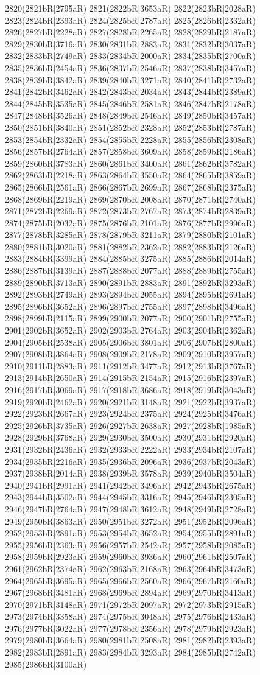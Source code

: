 2820(2821bR|2795aR) 2821(2822bR|3653aR) 2822(2823bR|2028aR) 2823(2824bR|2393aR) 2824(2825bR|2787aR) 2825(2826bR|2332aR) 2826(2827bR|2228aR) 2827(2828bR|2265aR) 2828(2829bR|2187aR) 2829(2830bR|3716aR) 2830(2831bR|2883aR) 2831(2832bR|3037aR) 2832(2833bR|2749aR) 2833(2834bR|2000aR) 2834(2835bR|2700aR) 2835(2836bR|2454aR) 2836(2837bR|2546aR) 2837(2838bR|3457aR) 2838(2839bR|3842aR) 2839(2840bR|3271aR) 2840(2841bR|2732aR) 2841(2842bR|3462aR) 2842(2843bR|2034aR) 2843(2844bR|2389aR) 2844(2845bR|3535aR) 2845(2846bR|2581aR) 2846(2847bR|2178aR) 2847(2848bR|3526aR) 2848(2849bR|2546aR) 2849(2850bR|3457aR) 2850(2851bR|3840aR) 2851(2852bR|2328aR) 2852(2853bR|2787aR) 2853(2854bR|2332aR) 2854(2855bR|2228aR) 2855(2856bR|2308aR) 2856(2857bR|2764aR) 2857(2858bR|3609aR) 2858(2859bR|2186aR) 2859(2860bR|3783aR) 2860(2861bR|3400aR) 2861(2862bR|3782aR) 2862(2863bR|2218aR) 2863(2864bR|3550aR) 2864(2865bR|3859aR) 2865(2866bR|2561aR) 2866(2867bR|2699aR) 2867(2868bR|2375aR) 2868(2869bR|2219aR) 2869(2870bR|2008aR) 2870(2871bR|2740aR) 2871(2872bR|2269aR) 2872(2873bR|2767aR) 2873(2874bR|2839aR) 2874(2875bR|2032aR) 2875(2876bR|2101aR) 2876(2877bR|2996aR) 2877(2878bR|3285aR) 2878(2879bR|3211aR) 2879(2880bR|2101aR) 2880(2881bR|3020aR) 2881(2882bR|2362aR) 2882(2883bR|2126aR) 2883(2884bR|3399aR) 2884(2885bR|3275aR) 2885(2886bR|2014aR) 2886(2887bR|3139aR) 2887(2888bR|2077aR) 2888(2889bR|2755aR) 2889(2890bR|3713aR) 2890(2891bR|2883aR) 2891(2892bR|3293aR) 2892(2893bR|2749aR) 2893(2894bR|2055aR) 2894(2895bR|2691aR) 2895(2896bR|3652aR) 2896(2897bR|2755aR) 2897(2898bR|3496aR) 2898(2899bR|2115aR) 2899(2900bR|2077aR) 2900(2901bR|2755aR) 2901(2902bR|3652aR) 2902(2903bR|2764aR) 2903(2904bR|2362aR) 2904(2905bR|2538aR) 2905(2906bR|3801aR) 2906(2907bR|2800aR) 2907(2908bR|3864aR) 2908(2909bR|2178aR) 2909(2910bR|3957aR) 2910(2911bR|2883aR) 2911(2912bR|3477aR) 2912(2913bR|3767aR) 2913(2914bR|2650aR) 2914(2915bR|2154aR) 2915(2916bR|2397aR) 2916(2917bR|3069aR) 2917(2918bR|3686aR) 2918(2919bR|3043aR) 2919(2920bR|2462aR) 2920(2921bR|3148aR) 2921(2922bR|3937aR) 2922(2923bR|2667aR) 2923(2924bR|2375aR) 2924(2925bR|3476aR) 2925(2926bR|3735aR) 2926(2927bR|2638aR) 2927(2928bR|1985aR) 2928(2929bR|3768aR) 2929(2930bR|3500aR) 2930(2931bR|2920aR) 2931(2932bR|2436aR) 2932(2933bR|2222aR) 2933(2934bR|2107aR) 2934(2935bR|2216aR) 2935(2936bR|2096aR) 2936(2937bR|2043aR) 2937(2938bR|2014aR) 2938(2939bR|3578aR) 2939(2940bR|3504aR) 2940(2941bR|2991aR) 2941(2942bR|3496aR) 2942(2943bR|2675aR) 2943(2944bR|3502aR) 2944(2945bR|3316aR) 2945(2946bR|2305aR) 2946(2947bR|2764aR) 2947(2948bR|3612aR) 2948(2949bR|2728aR) 2949(2950bR|3863aR) 2950(2951bR|3272aR) 2951(2952bR|2096aR) 2952(2953bR|2891aR) 2953(2954bR|3652aR) 2954(2955bR|2891aR) 2955(2956bR|2363aR) 2956(2957bR|2542aR) 2957(2958bR|2085aR) 2958(2959bR|2923aR) 2959(2960bR|3936aR) 2960(2961bR|2507aR) 2961(2962bR|2374aR) 2962(2963bR|2168aR) 2963(2964bR|3473aR) 2964(2965bR|3695aR) 2965(2966bR|2560aR) 2966(2967bR|2160aR) 2967(2968bR|3481aR) 2968(2969bR|2894aR) 2969(2970bR|3413aR) 2970(2971bR|3148aR) 2971(2972bR|2097aR) 2972(2973bR|2915aR) 2973(2974bR|3358aR) 2974(2975bR|3048aR) 2975(2976bR|2433aR) 2976(2977bR|3022aR) 2977(2978bR|2356aR) 2978(2979bR|2923aR) 2979(2980bR|3664aR) 2980(2981bR|2508aR) 2981(2982bR|2393aR) 2982(2983bR|2891aR) 2983(2984bR|3293aR) 2984(2985bR|2742aR) 2985(2986bR|3100aR) 